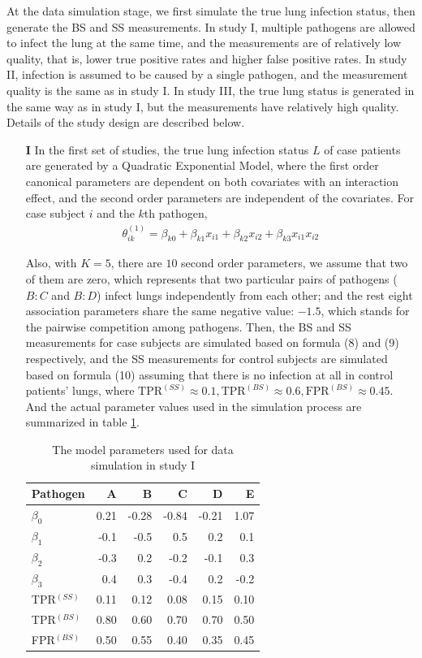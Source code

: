 \documentclass[11 pt, a4paper]{article}  %
\begin{document}
At the data simulation stage, we first simulate the true lung infection status, then generate the BS and SS measurements. In study I, multiple pathogens are allowed to infect the lung at the same time, and the measurements are of relatively low quality, that is, lower true positive rates and higher false positive rates. In study II, infection is assumed to be caused by a single pathogen, and the measurement quality is the same as in study I. In study III, the true lung status is generated in the same way as in study I, but the measurements have relatively high quality. Details of the study design are described below.

\begin{itemize}
\item[{\bf I}]
In the first set of studies, the true lung infection status $L$ of case patients are generated by a Quadratic Exponential Model, where the first order canonical parameters are dependent on both covariates with an interaction effect, and the second order parameters are independent of the covariates. For case subject $i$ and the $k$th pathogen, 
\begin{align*}
\theta^{(1)}_{ik} = \beta_{k0} + \beta_{k1} x_{i1} + \beta_{k2} x_{i2} + \beta_{k3} x_{i1} x_{i2}
\end{align*} 

Also, with $K = 5$, there are $10$ second order parameters, we assume that two of them are zero, which represents that two particular pairs of pathogens ($B:C$ and $B:D$) infect lungs independently from each other; and the rest eight association parameters share the same negative value: $-1.5$, which stands for the pairwise competition among pathogens. Then, the BS and SS measurements for case subjects are simulated based on formula (8) and (9) respectively, and the SS measurements for control subjects are simulated based on formula (10) assuming that there is no infection at all in control patients' lungs, where $\text{TPR}^{(SS)} \approx 0.1,  \text{TPR}^{(BS)} \approx 0.6, \text{FPR}^{(BS)} \approx 0.45$. And the actual parameter values used in the simulation process are summarized in table \ref{tab:study1}.

\begin{table}[h]
\centering
\caption{The model parameters used for data simulation in study I}
\label{tab:study1}
\begin{tabular}{lrrrrr}
\hline
Pathogen     & A    & B     & C     & D     & E    \\ \hline
$\beta_0$    & 0.21 & -0.28 & -0.84 & -0.21 & 1.07 \\
$\beta_1$    & -0.1 & -0.5  & 0.5   & 0.2   & 0.1  \\
$\beta_2$    & -0.3 & 0.2   & -0.2  & -0.1  & 0.3  \\
$\beta_3$    & 0.4  & 0.3   & -0.4  & 0.2   & -0.2 \\
TPR$^{(SS)}$ & 0.11 & 0.12  & 0.08  & 0.15  & 0.10 \\
TPR$^{(BS)}$ & 0.80 & 0.60  & 0.70  & 0.70  & 0.50 \\
FPR$^{(BS)}$ & 0.50 & 0.55  & 0.40  & 0.35  & 0.45 \\ \hline
\end{tabular}
\end{table}


\end{itemize}
\end{document}

